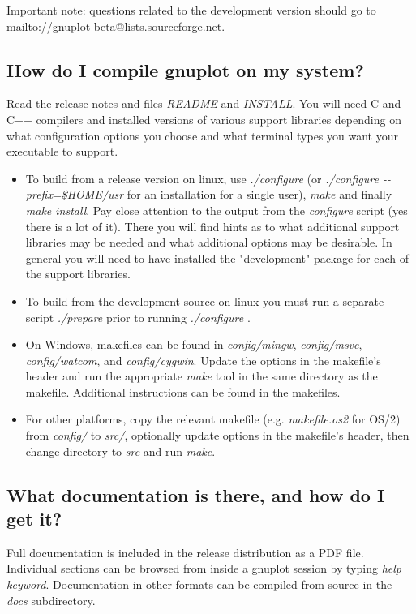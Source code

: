 \documentclass[a4paper,11pt]{article}
\def\mailto#1{{\small\href{mailto://#1}{\url{mailto://#1}}}}
\newcommand{\mailto}[1]%
            {\htmladdnormallink{\latex{\url{<#1>}}\html{\textit{#1}}}%
                {mailto:#1}%
            }
\newcommand{\gnuplot}{\textbf{gnuplot }}
\begin{document}
Important note: questions related to the development version should go to
\mailto{gnuplot-beta@lists.sourceforge.net}.


\subsection{How do I compile \gnuplot on my system?}

Read the release notes and files \textit{README} and \textit{INSTALL}.
You will need C and C++ compilers and installed versions of various
support libraries depending on what configuration options you choose and what
terminal types you want your executable to support.

\begin{itemize}
\item
To build from a release version on linux, use \textit{./configure} (or \textit{./configure {-}{-}prefix=\$HOME/usr}
for an installation for a single user), \textit{make} and finally
\textit{make install}.  Pay close attention to the output from the \textit{configure}
script (yes there is a lot of it).
There you will find hints as to what additional support libraries may be needed and
what additional options may be desirable.  In general you will need to have installed
the "development" package for each of the support libraries.
\item
To build from the development source on linux you must run a separate script \textit{./prepare}
prior to running \textit{./configure} .
\item
On Windows, makefiles can be found in \textit{config/mingw}, \textit{config/msvc},
\textit{config/watcom}, and \textit{config/cygwin}. Update the options in the 
makefile's header and run the appropriate \textit{make} tool in the same directory
as the makefile. Additional instructions can be found in the makefiles.
\item
For other platforms, copy the relevant makefile (e.g. \textit{makefile.os2} for
OS/2) from \textit{config/} to \textit{src/}, optionally update options in the
makefile's header, then change directory to \textit{src} and run \textit{make}.
\end{itemize}


\subsection{What documentation is there, and how do I get it?}

Full documentation is included in the release distribution as a PDF file.
Individual sections can be browsed from inside a gnuplot session
by typing \textit{help {\em keyword}}.
Documentation in other formats can be compiled from source in the
{\em docs} subdirectory.
\end{document}
